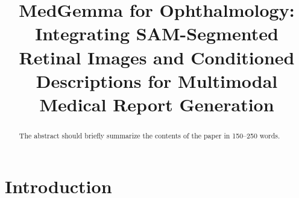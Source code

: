 \documentclass[runningheads]{llncs}
\begin{document}

\title{MedGemma for Ophthalmology: Integrating SAM-Segmented Retinal Images and Conditioned Descriptions for Multimodal Medical Report Generation}



%

%
%

\maketitle  %

\begin{abstract}
  The abstract should briefly summarize the contents of the paper in
  150--250 words.

\end{abstract}

\section{Introduction}
\end{document}
